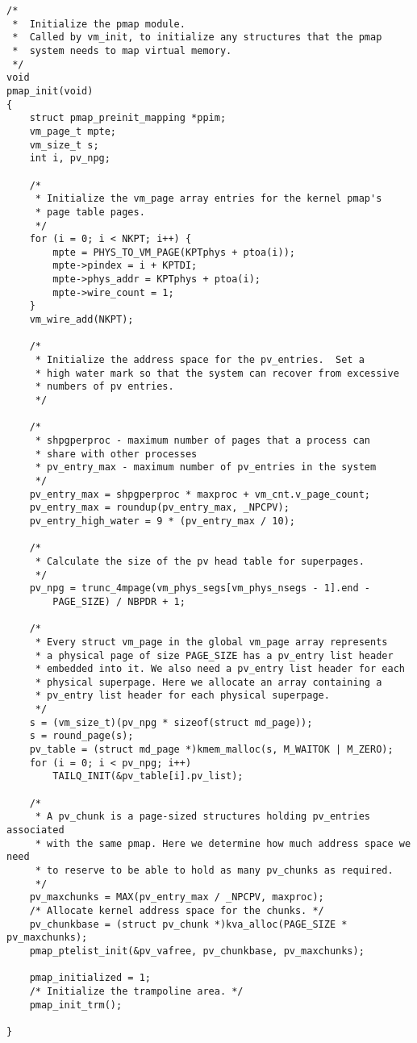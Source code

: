 \documentclass[shortabstract, english]{iithesis}
\newenvironment{code}{}{}
\begin{document}
\begin{code}
\begin{verbatim}
/*
 *  Initialize the pmap module.
 *  Called by vm_init, to initialize any structures that the pmap
 *  system needs to map virtual memory.
 */
void
pmap_init(void)
{
    struct pmap_preinit_mapping *ppim;
    vm_page_t mpte;
    vm_size_t s;
    int i, pv_npg;

    /*
     * Initialize the vm_page array entries for the kernel pmap's
     * page table pages.
     */
    for (i = 0; i < NKPT; i++) {
        mpte = PHYS_TO_VM_PAGE(KPTphys + ptoa(i));
        mpte->pindex = i + KPTDI;
        mpte->phys_addr = KPTphys + ptoa(i);
        mpte->wire_count = 1;
    }
    vm_wire_add(NKPT);

    /*
     * Initialize the address space for the pv_entries.  Set a
     * high water mark so that the system can recover from excessive
     * numbers of pv entries.
     */

    /*
     * shpgperproc - maximum number of pages that a process can
     * share with other processes
     * pv_entry_max - maximum number of pv_entries in the system
     */
    pv_entry_max = shpgperproc * maxproc + vm_cnt.v_page_count;
    pv_entry_max = roundup(pv_entry_max, _NPCPV);
    pv_entry_high_water = 9 * (pv_entry_max / 10);

    /*
     * Calculate the size of the pv head table for superpages.
     */
    pv_npg = trunc_4mpage(vm_phys_segs[vm_phys_nsegs - 1].end -
        PAGE_SIZE) / NBPDR + 1;

    /*
     * Every struct vm_page in the global vm_page array represents
     * a physical page of size PAGE_SIZE has a pv_entry list header
     * embedded into it. We also need a pv_entry list header for each
     * physical superpage. Here we allocate an array containing a
     * pv_entry list header for each physical superpage.
     */
    s = (vm_size_t)(pv_npg * sizeof(struct md_page));
    s = round_page(s);
    pv_table = (struct md_page *)kmem_malloc(s, M_WAITOK | M_ZERO);
    for (i = 0; i < pv_npg; i++)
        TAILQ_INIT(&pv_table[i].pv_list);

    /*
     * A pv_chunk is a page-sized structures holding pv_entries associated
     * with the same pmap. Here we determine how much address space we need
     * to reserve to be able to hold as many pv_chunks as required.
     */
    pv_maxchunks = MAX(pv_entry_max / _NPCPV, maxproc);
    /* Allocate kernel address space for the chunks. */
    pv_chunkbase = (struct pv_chunk *)kva_alloc(PAGE_SIZE * pv_maxchunks);
    pmap_ptelist_init(&pv_vafree, pv_chunkbase, pv_maxchunks);

    pmap_initialized = 1;
    /* Initialize the trampoline area. */
    pmap_init_trm();

}
\end{verbatim}
\end{code}
\end{document}
